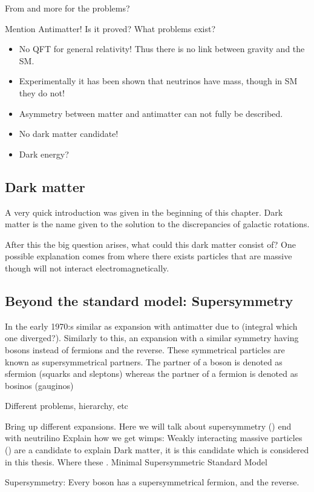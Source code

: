  From \citep{Burchan:1995} and more for the problems?
 
Mention Antimatter!
Is it proved? What problems exist? 
\begin{itemize}
\item No QFT for general relativity! Thus there is no link between gravity and the SM.
\item Experimentally it has been shown that neutrinos have mass, though in SM they do not!
\item Asymmetry between matter and antimatter can not fully be described.
\item No dark matter candidate!
\item Dark energy?
\end{itemize} 
\subsection{Dark matter}\label{sec:dark}
A very quick introduction was given in the beginning of this chapter. Dark matter is the name given to the solution to the discrepancies of galactic rotations. 

After this the big question arises, what could this dark matter consist of? One possible explanation comes from \abbrSUSY where there exists particles that are massive though will not interact electromagnetically.

\subsection{Beyond the standard model: Supersymmetry}
In the early 1970:s similar as \abbrQED expansion with antimatter due to (integral which one diverged?). Similarly to this, an expansion with a similar symmetry having bosons instead of fermions and the reverse. These symmetrical particles are known as supersymmetrical partners. The \abbrSUSY partner of a boson is denoted as sfermion (squarks and sleptons) whereas the \abbrSUSY partner of a fermion is denoted as bosinos (gauginos)

Different problems, hierarchy, etc

Bring up different expansions. Here we will talk about supersymmetry (\abbrSUSY) end with neutrilino
Explain how we get wimps:
Weakly interacting massive particles (\abbrWIMPS) are a candidate to explain Dark matter, it is this candidate which is considered in this thesis. Where these 
\abbrWIMPS. 
Minimal Supersymmetric Standard Model

Supersymmetry: Every boson has a supersymmetrical fermion, and the reverse.

